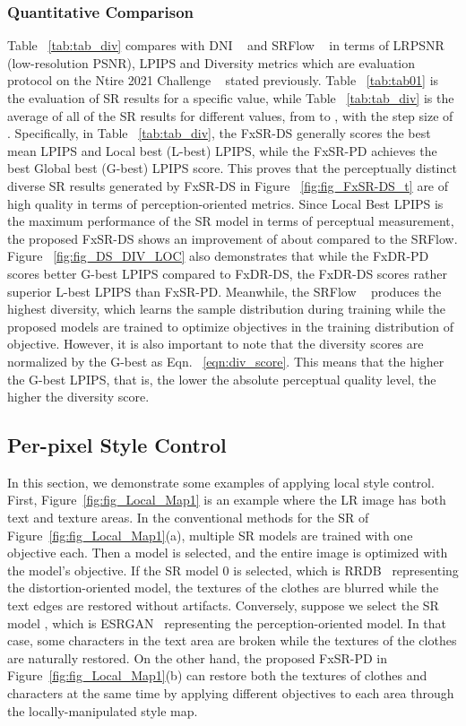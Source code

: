 \documentclass{article}
\begin{document}
\subsubsection{Quantitative Comparison}
Table ~\ref{tab:tab_div} compares with DNI ~\cite{wang2019deep} and SRFlow ~\cite{2020srflow} in terms of LRPSNR (low-resolution PSNR), LPIPS and Diversity metrics which are evaluation protocol on the Ntire 2021 Challenge ~\cite{SRSpace2021, Lugmayr_2021_CVPR} stated previously. Table ~\ref{tab:tab01} is the evaluation of SR results for a specific  value, while Table ~\ref{tab:tab_div} is the average of all of the SR results for  different  values, from  to , with the step size of . Specifically, in Table ~\ref{tab:tab_div}, the FxSR-DS generally scores the best mean LPIPS and Local best (L-best) LPIPS, while the FxSR-PD achieves the best Global best (G-best) LPIPS score. This proves that the perceptually distinct diverse SR results generated by FxSR-DS in Figure ~\ref{fig:fig_FxSR-DS_t} are of high quality in terms of perception-oriented metrics. Since Local Best LPIPS is the maximum performance of the SR model in terms of perceptual measurement, the proposed FxSR-DS shows an improvement of about  compared to the SRFlow. Figure ~\ref{fig:fig_DS_DIV_LOC} also demonstrates that while the FxDR-PD scores better G-best LPIPS compared to FxDR-DS, the FxDR-DS scores rather superior L-best LPIPS than FxSR-PD. Meanwhile, the SRFlow ~\cite{2020srflow} produces the highest diversity, which learns the sample distribution during training while the proposed models are trained to optimize objectives in the training distribution of objective. However, it is also important to note that the diversity scores are normalized by the G-best as Eqn. ~\ref{eqn:div_score}. This means that the higher the G-best LPIPS, that is, the lower the absolute perceptual quality level, the higher the diversity score.
 
\subsection{Per-pixel Style Control}
In this section, we demonstrate some examples of applying local style control. First, Figure~\ref{fig:fig_Local_Map1} is an example where the LR image has both text and texture areas. In the conventional methods for the SR of Figure~\ref{fig:fig_Local_Map1}(a), multiple SR models are trained with one objective each. Then a model is selected, and the entire image is optimized with the model's objective. If the SR model 0 is selected, which is RRDB~\cite{2018esrgan} representing the distortion-oriented model, the textures of the clothes are blurred while the text edges are restored without artifacts. Conversely, suppose we select the SR model , which is ESRGAN~\cite{2018esrgan} representing the perception-oriented model. In that case, some characters in the text area are broken while the textures of the clothes are naturally restored. On the other hand, the proposed FxSR-PD in Figure~\ref{fig:fig_Local_Map1}(b) can restore both the textures of clothes and characters at the same time by applying different objectives to each area through the locally-manipulated style map.
\end{document}
